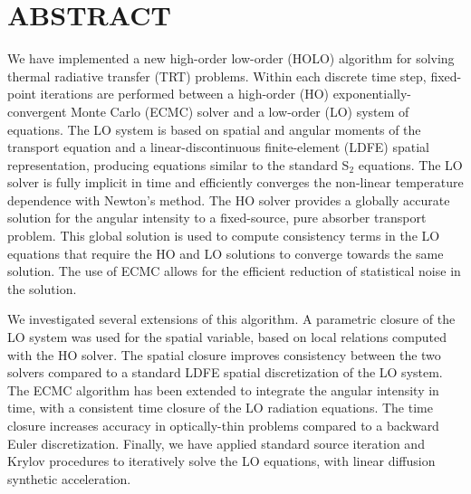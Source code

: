 %
%
%

\chapter*{ABSTRACT}

\pagestyle{plain} %
\setcounter{page}{2}

\indent 
We have implemented a new high-order low-order (HOLO) algorithm for solving
thermal radiative transfer (TRT) problems.  Within each discrete time step, fixed-point iterations are performed between a
high-order (HO) exponentially-convergent Monte Carlo (ECMC) solver and a low-order (LO)
system of equations.  The LO system is based on spatial
and angular moments of the transport equation and a linear-discontinuous
finite-element (LDFE) spatial representation, producing equations similar to the standard
S$_2$ equations.  
The LO solver is fully implicit in time and efficiently converges the non-linear
temperature dependence with Newton's method.   The HO solver
provides a globally accurate solution
for the angular intensity to a fixed-source, pure absorber transport problem.  This
global solution is used to compute consistency terms in the LO equations that require the HO and LO solutions
to converge towards the same solution. The use of ECMC
allows for the efficient reduction of statistical noise in the solution.
  
We investigated several extensions of this algorithm.
 A parametric closure
of the LO system was used for the spatial variable, based on local
relations computed with the HO solver.
The spatial closure improves
consistency between the two solvers compared to a standard LDFE spatial
discretization of the LO system.  The ECMC algorithm has been
extended to integrate the angular intensity in time,
with a consistent time closure of the LO radiation equations.  The
time closure increases accuracy in optically-thin problems compared to a backward Euler discretization.  
Finally, we have applied standard source iteration and Krylov procedures to
iteratively solve the LO equations, with linear diffusion synthetic acceleration.  


